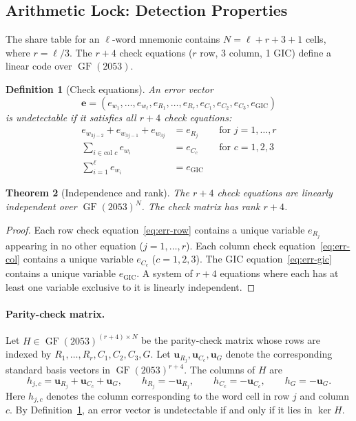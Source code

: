 \documentclass[11pt]{article}
\newcommand{\GF}{\operatorname{GF}}
\newtheorem{theorem}{Theorem}[subsection]
\newtheorem{definition}[theorem]{Definition}
\begin{document}
\subsection{Arithmetic Lock: Detection Properties}
\label{sec:arithmetic-lock}

The share table for an $\ell$-word mnemonic contains $N = \ell + r + 3 + 1$ cells, where $r = \ell/3$. The $r + 4$ check equations ($r$ row, 3 column, 1 GIC) define a linear code over $\GF(2053)$.

\begin{definition}[Check equations]
\label{def:checks}
An error vector
\[
    \mathbf{e} = (e_{w_1}, \ldots, e_{w_\ell},\allowbreak e_{R_1}, \ldots, e_{R_r},\allowbreak e_{C_1}, e_{C_2}, e_{C_3},\allowbreak e_{\text{GIC}})
\]
is \emph{undetectable} if it satisfies all $r + 4$ check equations:
\begin{align}
    e_{w_{3j-2}} + e_{w_{3j-1}} + e_{w_{3j}} &= e_{R_j} && \text{for } j = 1, \ldots, r \label{eq:err-row} \\
    \sum_{i \in \text{col } c} e_{w_i} &= e_{C_c} && \text{for } c = 1, 2, 3 \label{eq:err-col} \\
    \sum_{i=1}^{\ell} e_{w_i} &= e_{\text{GIC}} \label{eq:err-gic}
\end{align}
\end{definition}

\begin{theorem}[Independence and rank]
\label{thm:rank}
The $r + 4$ check equations are linearly independent over $\GF(2053)^N$. The check matrix has rank $r + 4$.
\end{theorem}

\begin{proof}
Each row check equation~\eqref{eq:err-row} contains a unique variable $e_{R_j}$ appearing in no other equation ($j = 1, \ldots, r$). Each column check equation~\eqref{eq:err-col} contains a unique variable $e_{C_c}$ ($c = 1, 2, 3$). The GIC equation~\eqref{eq:err-gic} contains a unique variable $e_{\text{GIC}}$. A system of $r + 4$ equations where each has at least one variable exclusive to it is linearly independent.
\end{proof}

\paragraph{Parity-check matrix.}
Let $H \in \GF(2053)^{(r+4) \times N}$ be the parity-check matrix whose rows are indexed by $R_1, \ldots, R_r, C_1, C_2, C_3, G$. Let $\mathbf{u}_{R_j}, \mathbf{u}_{C_c}, \mathbf{u}_G$ denote the corresponding standard basis vectors in $\GF(2053)^{r+4}$. The columns of $H$ are
\[
    h_{j,c} = \mathbf{u}_{R_j} + \mathbf{u}_{C_c} + \mathbf{u}_G,\qquad
    h_{R_j} = -\mathbf{u}_{R_j},\qquad
    h_{C_c} = -\mathbf{u}_{C_c},\qquad
    h_G = -\mathbf{u}_G.
\]
Here $h_{j,c}$ denotes the column corresponding to the word cell in row $j$ and column $c$. By Definition~\ref{def:checks}, an error vector is undetectable if and only if it lies in $\ker H$.
\end{document}
